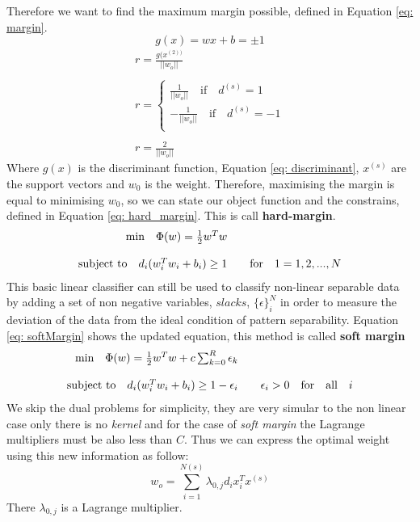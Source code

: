 \documentclass[11pt]{article}
\begin{document}
Therefore we want to find the maximum margin possible, defined in Equation \ref{eq: margin}.
\begin{equation}
g(x) = w x + b = \pm 1
\label{eq: discriminant}
\end{equation}
\begin{equation}
\begin{matrix}
r = \frac{g(x^{(2))}}{||w_o||} \\ 
\\
r =  \left  \{
 \begin{matrix}
  \frac{1}{||w_o||} \quad \text{if} \quad d^{(s)} = 1\\
  - \frac{1}{||w_o||} \quad \text{if} \quad d^{(s)} = -1 \\
  \end{matrix}	\\
\\
r = \frac{2}{||w_o||}
\end{matrix}
\label{eq: margin}
\end{equation}
Where $g(x)$ is the discriminant function, Equation \ref{eq: discriminant}, $x^(s)$ are the support vectors and $w_0$ is the  weight. Therefore, maximising the margin is equal to minimising $w_0$, so we can state our object function and the constrains, defined in Equation \ref{eq: hard_margin}. This is call \textbf{hard-margin}.
\begin{equation}
 \begin{array}{r c l}
	\text{min} \quad \Phi(w) = \frac{1}{2} w^Tw \\ 
	\\
	\text{subject to} \quad d_i(w_i^Tw_i + b_i) \ge 1 && \text{for} \quad 1 = 1,2, ..., N
\end{array}
\label{eq: hard_margin}
\end{equation}
This basic linear classifier can still be used to classify non-linear separable data by adding a set of non negative variables, $slacks$, $\{\epsilon\}_i^N$ in order to measure the deviation of the data from the ideal condition of pattern separability. Equation \ref{eq: softMargin} shows the updated equation, this method is called \textbf{soft margin}
\begin{equation}
 \begin{array}{r c l}
\text{min} \quad \Phi(w) = \frac{1}{2} w^Tw + c \sum_{k=0}^R \epsilon_k \\
	\\
\text{subject to} \quad d_i(w_i^Tw_i + b_i) \ge 1 - \epsilon_i && \epsilon_i > 0 \quad \text{for} \quad \text{all} \quad  i
\end{array}
\label{eq: softMargin}
\end{equation}
We skip the dual problems for simplicity, they are very simular to the non linear case only there is no \emph{kernel} and for the case of \emph{soft margin} the Lagrange multipliers must be also less than $C$. Thus we can express the optimal weight using this new information as follow:
\begin{equation}
w_o = \sum_{i=1}^{N(s)}\lambda_{0,j}d_ix_i^Tx^{(s)}
\label{eq: optimal_weight_lagrande}
\end{equation}
There $\lambda_{0,j}$ is a Lagrange multiplier.
\end{document}
